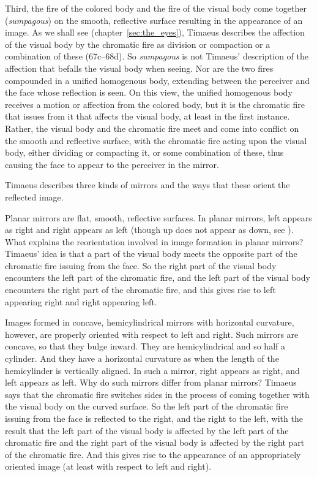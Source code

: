 Third, the fire of the colored body and the fire of the visual body come together (\emph{sumpagous}) on the smooth, reflective surface resulting in the appearance of an image. As we shall see (chapter~\ref{sec:the_eyes}), Timaeus describes the affection of the visual body by the chromatic fire as division  or compaction or a combination of these (67c–68d). So \emph{sumpagous} is not Timaeus' description of the affection that befalls the visual body when seeing. Nor are the two fires compounded in a unified homogenous body, extending between the perceiver and the face whose reflection is seen. On this view, the unified homogenous body receives a motion or affection from the colored body, but it is the chromatic fire that issues from it that affects the visual body, at least in the first instance.  Rather, the visual body and the chromatic fire meet and come into conflict on the smooth and reflective surface, with the chromatic fire acting upon the visual body, either dividing or compacting it, or some combination of these, thus causing the face to appear to the perceiver in the mirror.

Timaeus describes three kinds of mirrors and the ways that these orient the reflected image.

Planar mirrors are flat, smooth, reflective surfaces. In planar mirrors, left appears as right and right appears as left (though up does not appear as down, see \citealt{Block:1974tk}). What explains the reorientation involved in image formation in planar mirrors? Timae\-us' idea is that a part of the visual body meets the opposite part of the chromatic fire issuing from the face. So the right part of the visual body encounters the left part of the chromatic fire, and the left part of the visual body encounters the right part of the chromatic fire, and this gives rise to left appearing right and right appearing left.

Images formed in concave, hemicylindrical mirrors with horizontal curvature, however, are properly oriented with respect to left and right. Such mirrors are concave, so that they bulge inward. They are hemicylindrical and so half a cylinder. And they have a horizontal curvature as when the length of the hemicylinder is vertically aligned. In such a mirror, right appears as right, and left appears as left. Why do such mirrors differ from planar mirrors? Timaeus says that the chromatic fire switches sides in the process of coming together with the visual body on the curved surface. So the left part of the chromatic fire issuing from the face is reflected to the right, and the right to the left, with the result that the left part of the visual body is affected by the left part of the chromatic fire and the right part of the visual body is affected by the right part of the chromatic fire. And this gives rise to the appearance of an appropriately oriented image (at least with respect to left and right).

